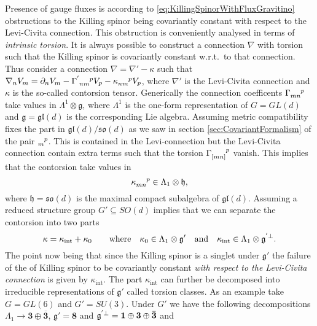 Presence of gauge fluxes is according to \eqref{eq:KillingSpinorWithFluxGravitino} obstructions to the Killing spinor being covariantly constant with respect to the Levi-Civita connection. This obstruction is conveniently analysed in terms of \emph{intrinsic torsion}. It is always possible to construct a connection $\nabla$ with torsion such that the Killing spinor is covariantly constant w.r.t.\ to that connection. Thus consider a connection $\nabla=\nabla'-\kappa$ such that $\nabla_n V_m=\pd_nV_m-\tensor{\Gamma}{^'_{nm}^p}V_p-\tensor{\kappa}{_{nm}^p}V_p$, where $\nabla'$ is the Levi-Civita connection and $\kappa$ is the so-called contorsion tensor. Generically the connection coefficents $\tensor{\Gamma}{_{mn}^p}$ take values in $\Lambda^1\otimes\mathfrak{g}$, where $\Lambda^1$ is the one-form representation of $G=GL(d)$ and $\mathfrak{g}=\mathfrak{gl}(d)$ is the corresponding Lie algebra. Assuming metric compatibility fixes the part in $\mathfrak{gl}(d)/\mathfrak{so}(d)$ as we saw in section \ref{sec:CovariantFormalism} of the pair $\tensor{}{_m^p}$. This is contained in the Levi-connection but the Levi-Civita connection contain extra terms such that the torsion $\tensor{\Gamma}{_{[mn]}^p}$ vanish. This implies that the contorsion take values in 
\begin{equation}
    \tensor{\kappa}{_{mn}^p}\in \Lambda_1\otimes \mathfrak{h},
\end{equation}
where $\mathfrak{h}=\mathfrak{so}(d)$ is the maximal compact subalgebra of $\mathfrak{gl}(d)$. Assuming a reduced structure group $G'\subseteq SO(d)$ implies that we can separate the contorsion into two parts 
\begin{equation}
    \kappa = \kappa_\text{int}+\kappa_{0}\qquad \text{where} \quad \kappa_{0}\in \Lambda_1\otimes \mathfrak{g}'\quad \text{and}\quad \kappa_{\text{int}}\in \Lambda_1\otimes \tensor{\mathfrak{g}}{^'^{\perp}}.
\end{equation}
The point now being that since the Killing spinor is a singlet under $\mathfrak{g}'$ the failure of the of Killing spinor to be covariantly constant \emph{with respect to the Levi-Civita connection} is given by $\kappa_{\text{int}}$. The part $\kappa_{\text{int}}$ can further be decomposed into irreducible representations of $\mathfrak{g}'$ called torsion classes. As an example take $G=GL(6)$ and $G'=SU(3)$. Under $G'$ we have the following decompositions $\Lambda_1\to \mathbf{3}\oplus\overbar{\mathbf{3}}$, $\mathfrak{g}'=\mathbf{8}$ and $\tensor{\mathfrak{g}}{^'^{\perp}}=\mathbf{1}\oplus\mathbf{3}\oplus\overbar{\mathbf{3}}$ and 
